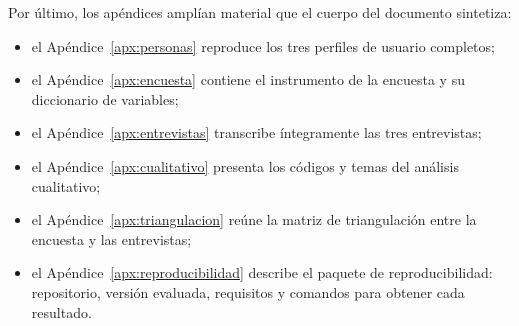 Por último, los apéndices amplían material que el cuerpo del documento sintetiza:

\begin{itemize}
    \item el Apéndice~\ref{apx:personas} reproduce los tres perfiles de usuario completos;
    \item el Apéndice~\ref{apx:encuesta} contiene el instrumento de la encuesta y su diccionario de variables;
    \item el Apéndice~\ref{apx:entrevistas} transcribe íntegramente las tres entrevistas;
    \item el Apéndice~\ref{apx:cualitativo} presenta los códigos y temas del análisis cualitativo;
    \item el Apéndice~\ref{apx:triangulacion} reúne la matriz de triangulación entre la encuesta y las entrevistas;
    \item el Apéndice~\ref{apx:reproducibilidad} describe el paquete de reproducibilidad: repositorio, versión evaluada, requisitos y comandos para obtener cada resultado.
\end{itemize}
